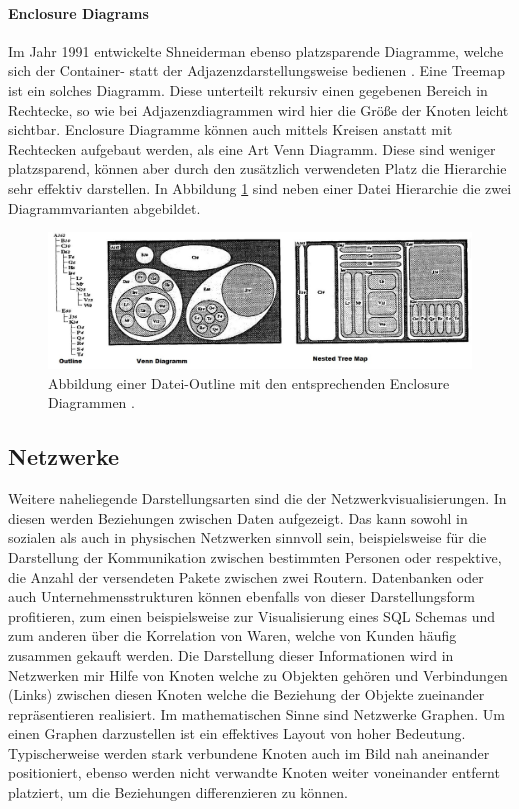 \documentclass[draft=false
              ,paper=a4
              ,twoside=false
              ,fontsize=11pt
              ,headsepline
              ,BCOR10mm
              ,DIV11
              ]{scrbook}
\begin{document}
\paragraph{Enclosure Diagrams} %
\label{par:enclosure_diagrams}
Im Jahr 1991 entwickelte Shneiderman ebenso platzsparende Diagramme, welche sich der Container- statt der Adjazenzdarstellungsweise bedienen \cite{shneiderman_1991}. Eine Treemap ist ein solches Diagramm. Diese unterteilt rekursiv einen gegebenen Bereich in Rechtecke, so wie bei Adjazenzdiagrammen wird hier die Größe der Knoten leicht sichtbar. Enclosure Diagramme können auch mittels Kreisen anstatt mit Rechtecken aufgebaut werden, als eine Art Venn Diagramm. Diese sind weniger platzsparend, können aber durch den zusätzlich verwendeten Platz die Hierarchie sehr effektiv darstellen. In Abbildung \ref{fig:enclosure} sind neben einer Datei Hierarchie die zwei Diagrammvarianten abgebildet.

\begin{figure}[htbp]
  \centering
  \includegraphics[width=\textwidth]{img/outline}
  \caption{Abbildung einer Datei-Outline mit den entsprechenden Enclosure Diagrammen \cite{shneiderman_1991}.}
  \label{fig:enclosure}
\end{figure}

\subsection{Netzwerke} %
\label{ssub:netzwerke}
Weitere naheliegende Darstellungsarten sind die der Netzwerkvisualisierungen. In diesen werden Beziehungen zwischen Daten aufgezeigt. Das kann sowohl in sozialen als auch in physischen Netzwerken sinnvoll sein, beispielsweise für die Darstellung der Kommunikation zwischen bestimmten Personen oder respektive, die Anzahl der versendeten Pakete zwischen zwei Routern. Datenbanken oder auch Unternehmensstrukturen können ebenfalls von dieser Darstellungsform profitieren, zum einen beispielsweise zur Visualisierung eines SQL Schemas und zum anderen über die Korrelation von Waren, welche von Kunden häufig zusammen gekauft werden. Die Darstellung dieser Informationen wird in Netzwerken mir Hilfe von Knoten welche zu Objekten gehören und Verbindungen (Links) zwischen diesen Knoten welche die Beziehung der Objekte zueinander repräsentieren realisiert. Im mathematischen Sinne sind Netzwerke Graphen. Um einen Graphen darzustellen ist ein effektives Layout von hoher Bedeutung. Typischerweise werden stark verbundene Knoten auch im Bild nah aneinander positioniert, ebenso werden nicht verwandte Knoten weiter voneinander entfernt platziert, um die Beziehungen differenzieren zu können.
\end{document}
